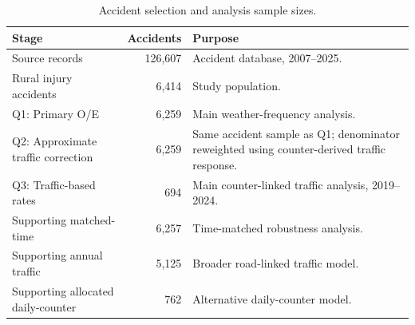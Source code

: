 \begin{table}[H]
\centering
\footnotesize
\caption[Analysis sample sizes.]{Accident selection and analysis sample sizes.}
\label{tab:coverage}
\begin{tabularx}{\textwidth}{L{0.34\textwidth}rX}
\toprule
Stage & Accidents & Purpose \\
\midrule
Source records & 126,607 & Accident database, 2007--2025. \\ \grayhline
Rural injury accidents & 6,414 & Study population. \\ \grayhline
Q1: Primary O/E & 6,259 & Main weather-frequency analysis. \\ \grayhline
Q2: Approximate traffic correction & 6,259 & Same accident sample as Q1; denominator reweighted using counter-derived traffic response. \\ \grayhline
Q3: Traffic-based rates & 694 & Main counter-linked traffic analysis, 2019--2024. \\ \grayhline
Supporting matched-time & 6,257 & Time-matched robustness analysis. \\ \grayhline
Supporting annual traffic & 5,125 & Broader road-linked traffic model. \\ \grayhline
Supporting allocated daily-counter & 762 & Alternative daily-counter model. \\
\bottomrule
\end{tabularx}
\end{table}
